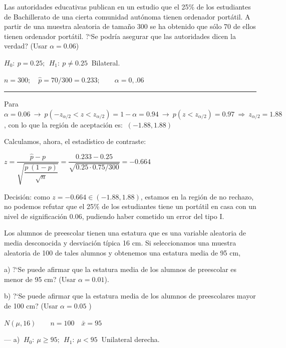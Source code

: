 \vspace{4mm}
\begin{ejemplo}
\begin{ejer}
	Las autoridades educativas publican en un estudio que el 25\% de los estudiantes de Bachillerato de una cierta comunidad autónoma tienen ordenador portátil. A partir de una muestra aleatoria de tamaño 300 se ha obtenido que sólo 70 de ellos tienen ordenador portátil. ?`Se podría asegurar que las autoridades dicen la verdad? (Usar $\alpha = 0.06$)
\end{ejer}
\end{ejemplo}

$H_0:\ p=0.25;\ \ H_1:\ p\neq 0.25\ $ Bilateral.

$n=300;\quad \widehat p=70/300=0.233;\qquad \alpha=0,.06$

\rule{150pt}{0.1pt}

Para $\alpha=0.06 \ \to \ p(-z_{\alpha/2}<z<z_{\alpha/2})=1-\alpha=0.94 \ \to \ p(z<z_{\alpha/2})=0.97  \ \Rightarrow \ z_{\alpha/2}=1.88$, con lo que la región de aceptación es: $\ (-1.88,1.88)$

Calculamos, ahora, el estadístico de contraste:

$z=\dfrac{\widehat p -p}{\sqrt{\dfrac{p\ (1-p)}{\sqrt{n}}}}=
\dfrac{0.233 - 0.25}{\sqrt{0.25 \cdot 0.75/300}}=-0.664$

Decisión: como $z=-0.664 \in (-1.88,1.88)$, estamos en la región de no rechazo, no podemos refutar que el 25\% de los estudiantes tiene un portátil en casa con un nivel de significación 0.06, pudiendo haber cometido un error del tipo I. 


\vspace{4mm}
\begin{ejemplo}
\begin{ejer}
Los alumnos de preescolar tienen una estatura que es una variable aleatoria de media desconocida y desviación típica 16 cm. Si seleccionamos una muestra aleatoria de 100 de tales alumnos y obtenemos una estatura media de 95 cm,

a) ?`Se puede afirmar que la estatura media de los alumnos de preescolar es menor de 95 cm? (Usar $\alpha=0.01$).

b) ?`Se puede afirmar que la estatura media de los alumnos de preescolares mayor de 100 cm? (Usar $\alpha=0.05$ )
\end{ejer}
\end{ejemplo}
$N(\mu,16)\qquad n=100 \quad \bar x=95$

--- a) $\ H_0 : \ \mu \ge 95 ; \ \ H_1: \ \mu < 95 \ $ Unilateral derecha.

